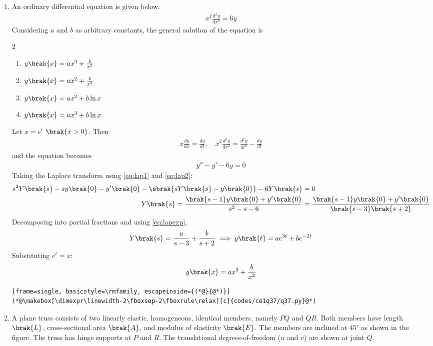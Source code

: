 \begin{enumerate}[label=\thesubsection.\arabic*, ref=\thesubsection.\theenumi, itemsep=0pt, leftmargin=*]
\item An ordinary differential equation is given below.
\begin{align}
x^2\frac{d^2y}{dx^2} = 6y
\end{align}
Considering $a$ and $b$ as arbitrary constants, the general solution of the equation is \gate
\begin{multicols}{2}
\begin{enumerate}[label=\alph*), itemsep=0pt]
\item $y\brak{x} = ax^3 + \frac{b}{x^2}$
\item $y\brak{x} = ax^2 + \frac{b}{x^3}$
\item $y\brak{x} = ax^2 + b\ln x$
\item $y\brak{x} = ax^3 + b\ln x$
\end{enumerate}
\end{multicols}
\solution Let $x = e^t$ $\brak{x > 0}$. Then
\begin{align}
x\frac{dy}{dx} = \frac{dy}{dt},\quad x^2\frac{d^2y}{dx^2} = \frac{d^2y}{dt^2} - \frac{dy}{dt}
\end{align}
and the equation becomes
\begin{align}
y'' - y' - 6y = 0
\label{eq:q37t}
\end{align}
Taking the Laplace transform using \eqref{eq:lap1} and \eqref{eq:lap2}:
\begin{align}
s^2Y\brak{s} - sy\brak{0} - y'\brak{0} - \sbrak{sY\brak{s} - y\brak{0}} - 6Y\brak{s} &= 0\\
Y\brak{s} = \frac{\brak{s-1}y\brak{0} + y'\brak{0}}{s^2 - s - 6} &= \frac{\brak{s-1}y\brak{0} + y'\brak{0}}{\brak{s-3}\brak{s+2}}
\end{align}
Decomposing into partial fractions and using \eqref{eq:lapexp},
\begin{align}
Y\brak{s} = \frac{a}{s-3} + \frac{b}{s+2} \implies y\brak{t} = ae^{3t} + be^{-2t}
\end{align}
Substituting $e^t = x$:
\begin{align}
y\brak{x} = ax^3 + \frac{b}{x^2}
\end{align}

\begin{lstlisting}[frame=single, basicstyle=\rmfamily, escapeinside={(*@}{@*)}]
(*@\makebox[\dimexpr\linewidth-2\fboxsep-2\fboxrule\relax][c]{codes/ce1q37/q37.py}@*)
\end{lstlisting}

\item A plane truss consists of two linearly elastic, homogeneous, identical members, namely $PQ$ and $QR$. Both members have length $\brak{L}$, cross-sectional area $\brak{A}$, and modulus of elasticity $\brak{E}$. The members are inclined at $45^\circ$ as shown in the figure. The truss has hinge supports at $P$ and $R$. The translational degrees-of-freedom ($u$ and $v$) are shown at joint $Q$.


\end{enumerate}
